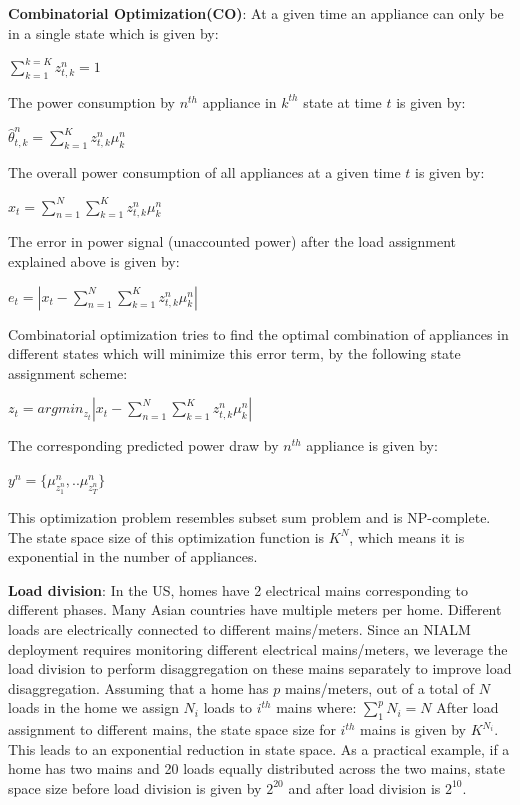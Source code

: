 \documentclass[conference]{IEEEtran}
\begin{document}
\noindent \textbf{Combinatorial Optimization(CO)}: At a given time an appliance can only be in a single state which is given by:

$\sum\limits_{k=1}^{k=K} z_{t,k}^n=1$ 

\noindent The power consumption by $n^{th}$ appliance in $k^{th}$ state at time $t$ is given by:

$\hat{\theta}^n_{t,k}=\sum\limits_{k=1}^{K} z_{t,k}^n \mu_k^n$

\noindent The overall power consumption of all appliances at a given time $t$ is given by:

$\hat{x}_{t}=\sum\limits_{n=1}^{N}\sum\limits_{k=1}^{K} z_{t,k}^n \mu_k^n$

\noindent The error in power signal (unaccounted power) after the load assignment explained above is given by:

$e_t=|x_t-\sum\limits_{n=1}^{N}\sum\limits_{k=1}^{K}z_{t,k}^n\mu_k^n|$

\noindent Combinatorial optimization tries to find the optimal combination of appliances in different states which will minimize this error term, by the following state assignment scheme:

$z_t=arg min_{z_t}|x_t-\sum\limits_{n=1}^{N}\sum\limits_{k=1}^{K}z_{t,k}^n\mu_k^n|$

\noindent The corresponding predicted power draw by $n^{th}$ appliance is given by:

$y^n=\{\mu_{z_1^n}^n,..\mu_{z_T^n}^n \}$

\noindent This optimization problem resembles subset sum problem \cite{knapsack} and is NP-complete. The state space size of this optimization function is $K^N$, which means it is exponential in the number of appliances. 


\noindent \textbf{Load division}: In the US, homes have 2 electrical mains corresponding to different phases. Many Asian countries have multiple meters per home. Different loads are electrically connected to different mains/meters. Since an NIALM deployment requires monitoring different electrical mains/meters, we leverage the load division to perform disaggregation on these mains separately to improve load disaggregation. Assuming that a home has $p$ mains/meters, out of a total of $N$ loads in the home we assign $N_i$ loads to $i^{th}$ mains where: $\sum\limits_{1}^{p}{N_i}=N$
After load assignment to different mains, the state space size for $i^{th}$ mains is given by $K^{N_i}$. This leads to an exponential reduction in state space. As a practical example, if a home has two mains and 20 loads equally distributed across the two mains, state space size before load division is given by $2^{20}$ and after load division is $2^{10}$. 
\end{document}
